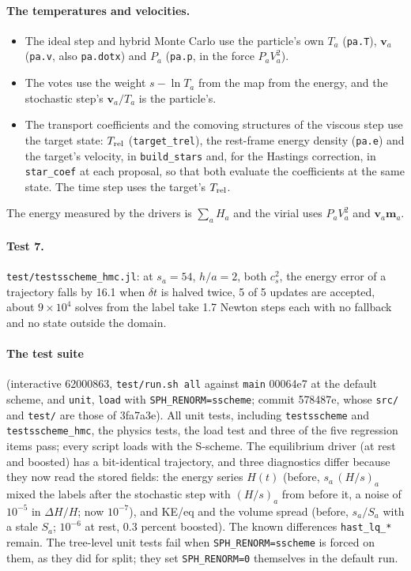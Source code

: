 \documentclass[11pt,aps,preprint,nofootinbib,superscriptaddress,tightenlines]{revtex4-2}
\let\oldparagraph\paragraph
\renewcommand{\paragraph}{\par\bigskip\oldparagraph}
\begin{document}
\paragraph{The temperatures and velocities.}
\begin{itemize}
\item The ideal step and hybrid Monte Carlo use the particle's own $T_a$ (\texttt{pa.T}), $\bm v_a$ (\texttt{pa.v}, also \texttt{pa.dotx}) and $P_a$
  (\texttt{pa.p}, in the force $P_aV_a^2$).
\item The votes use the weight $s-\ln T_a$ from the map from the energy, and the stochastic step's $\bm v_a/T_a$ is the particle's.
\item The transport coefficients and the comoving structures of the viscous step use the target state: $T_{\rm rel}$ (\texttt{target\_trel}), the
  rest-frame energy density (\texttt{pa.e}) and the target's velocity, in \texttt{build\_stars} and, for the Hastings correction, in
  \texttt{star\_coef} at each proposal, so that both evaluate the coefficients at the same state.  The time step uses the target's $T_{\rm rel}$.
\end{itemize}
The energy measured by the drivers is $\sum_aH_a$ and the virial uses $P_aV_a^2$ and $\bm v_a\bm m_a$.

\paragraph{Test 7.}  \nolinkurl{test/testsscheme_hmc.jl}: at $s_a=54$, $h/a=2$, both $c_s^2$, the energy error of a trajectory falls by 16.1 when
$\delta t$ is halved twice, 5 of 5 updates are accepted, about $9\times10^4$ solves from the label take 1.7 Newton steps each with no fallback and no
state outside the domain.

\paragraph{The test suite} (interactive 62000863, \texttt{test/run.sh all} against \texttt{main} 00064e7 at the default scheme, and \texttt{unit},
\texttt{load} with \texttt{SPH\_RENORM=sscheme}; commit 578487e, whose \nolinkurl{src/} and \nolinkurl{test/} are those of 3fa7a3e).  All unit tests,
including \texttt{testsscheme} and \texttt{testsscheme\_hmc}, the physics tests, the load test and three of the five regression items pass; every
script loads with the S-scheme.  The equilibrium driver (at rest and boosted) has a bit-identical trajectory, and three diagnostics differ because they
now read the stored fields: the energy series $H(t)$ (before, $s_a\,(H/s)_a$ mixed the labels after the stochastic step with $(H/s)_a$ from before it, a
noise of $10^{-5}$ in $\Delta H/H$; now $10^{-7}$), and KE/eq and the volume spread (before, $s_a/S_a$ with a stale $S_a$; $10^{-6}$ at rest, 0.3 percent
boosted).  The known differences \texttt{hast\_lq\_*} remain.  The tree-level unit tests fail when \texttt{SPH\_RENORM=sscheme} is forced on them, as
they did for split; they set \texttt{SPH\_RENORM=0} themselves in the default run.
\end{document}
